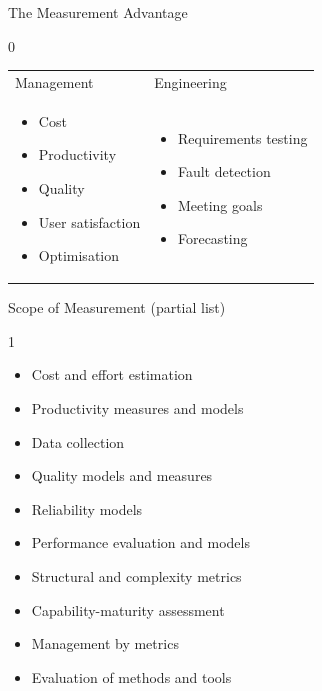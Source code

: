 \documentclass{beamer}
\begin{document}
\begin{frame}{\centerline{The Measurement Advantage}}
0
\begin{table}[H]

\begin{tabulary}{\textwidth}{m{5.5cm} m{5.5cm}}
Management &
Engineering \\

\begin{itemize}    
    \item Cost
    \item Productivity
    \item Quality
    \item User satisfaction
    \item Optimisation
\end{itemize} &
\begin{itemize}    
    \item Requirements testing
    \item Fault detection
    \item Meeting goals
    \item Forecasting
\end{itemize}
\end{tabulary}
\end{table}

\end{frame}

\begin{frame}{\centerline{Scope of Measurement (partial list)}}
1
\begin{itemize}
    \item Cost and effort estimation
    \item Productivity measures and models
    \item Data collection
    \item Quality models and measures
    \item Reliability models
    \item Performance evaluation and models
    \item Structural and complexity metrics
    \item Capability-maturity assessment
    \item Management by metrics
    \item Evaluation of methods and tools
\end{itemize}
\end{frame}
\end{document}
